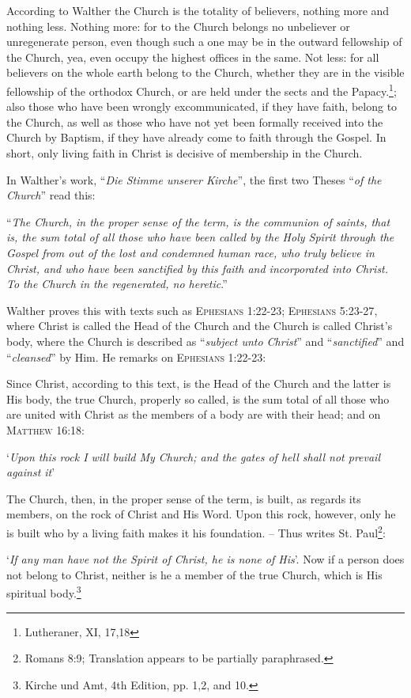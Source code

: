                 According to Walther the Church is the totality of believers, nothing more and nothing less.  Nothing more: for to the Church belongs no unbeliever or unregenerate person, even though such a one may be in the outward fellowship of the Church, yea, even occupy the highest offices in the same.  Not less: for all believers on the whole earth belong to the Church, whether they are in the visible fellowship of the orthodox Church, or are held under the sects and the Papacy.\footnote{Lutheraner, XI, 17,18}; also those who have been wrongly excommunicated, if they have faith, belong to the Church, as well as those who have not yet been formally received into the Church by Baptism, if they have already come to faith through the Gospel.  In short, only living faith in Christ is decisive of membership in the Church.  \par In Walther’s work, “\textit{Die Stimme unserer Kirche}”, the first two Theses “\textit{of the Church}” read this:\begin{displayquote}``\textit{The Church, in the proper sense of the term, is the communion of saints, that is, the sum total of all those who have been called by the Holy Spirit through the Gospel from out of the lost and condemned human race, who truly believe in Christ, and who have been sanctified by this faith and incorporated into Christ.  To the Church in the regenerated, no heretic}.''\end{displayquote}  Walther proves this with texts such as {\scriptsize\textsc{Ephesians 1:22-23; Ephesians 5:23-27}}, where Christ is called the Head of the Church and the Church is called Christ’s body, where the Church is described as “\textit{subject unto Christ}” and “\textit{sanctified}” and “\textit{cleansed}” by Him.  He remarks on {\scriptsize\textsc{Ephesians 1:22-23}}: \begin{fancyquotes}Since Christ, according to this text, is the Head of the Church and the latter is His body, the true Church, properly so called, is the sum total of all those who are united with Christ as the members of a body are with their head; and on {\scriptsize\textsc{Matthew 16:18}}: \begin{displayquote}`\textit{Upon this rock I will build My Church; and the gates of hell shall not prevail against it}'\end{displayquote} The Church, then, in the proper sense of the term, is built, as regards its members, on the rock of Christ and His Word.  Upon this rock, however, only he is built who by a living faith makes it his foundation.  -- Thus writes St. Paul\footnote{Romans 8:9;  Translation appears to be partially paraphrased.}: \begin{displayquote}`\textit{If any man have not the Spirit of Christ, he is none of His}’.  Now if a person does not belong to Christ, neither is he a member of the true Church, which is His spiritual body.\footnote{Kirche und Amt, 4th Edition, pp. 1,2, and 10.}\end{displayquote}\end{fancyquotes}
